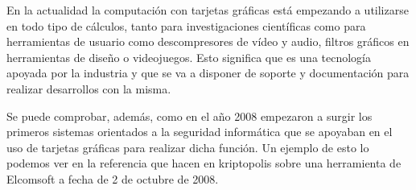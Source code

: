 En la actualidad la computación con tarjetas gráficas está empezando a utilizarse en todo tipo de cálculos, tanto para investigaciones científicas como para herramientas de usuario como descompresores de vídeo y audio, filtros gráficos en herramientas de diseño o videojuegos. Esto significa que es una tecnología apoyada por la industria y que se va a disponer de soporte y documentación para realizar desarrollos con la misma.

Se puede comprobar, además, como en el año 2008 empezaron a surgir los primeros sistemas orientados a la seguridad informática que se apoyaban en el uso de tarjetas gráficas para realizar dicha función. Un ejemplo de esto lo podemos ver en la referencia que hacen en kriptopolis sobre una herramienta de Elcomsoft a fecha de 2 de octubre de 2008.

